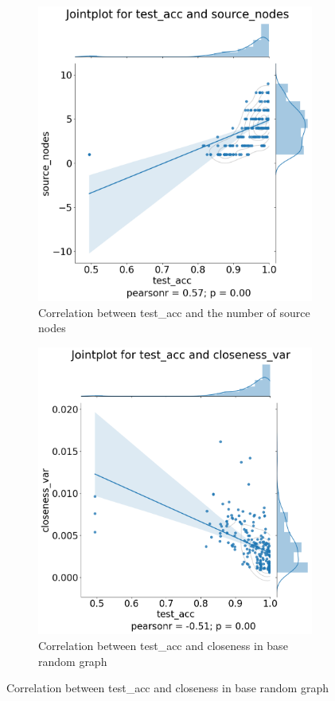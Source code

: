 \begin{figure}[H]
    \bigskip
    \begin{subfigure}{0.45\textwidth}
        \includegraphics[width=\linewidth]{images/results/random/lstm/jointplot_test_acc_source_nodes.png}
        \caption{Correlation between test\_acc and the number of source nodes} \label{fig:jp_lstm_source}
    \end{subfigure}
    \hfill
    \begin{subfigure}{0.45\textwidth}
        \includegraphics[width=\linewidth]{images/results/random/lstm/jointplot_test_acc_closeness_var.png}
        \caption{Correlation between test\_acc and closeness in base random graph} \label{fig:jp_lstm_close}
    \end{subfigure}


\end{figure}
